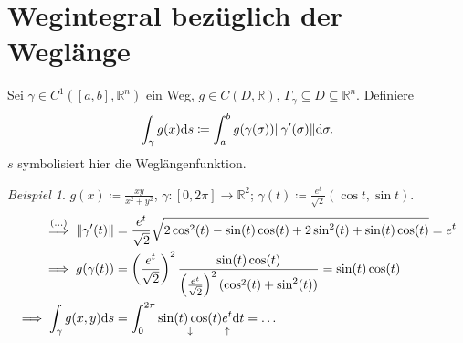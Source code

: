 \documentclass[a4paper]{article}
\theoremstyle{definition}
\theoremstyle{remark}
\newtheorem{beispiel}{Beispiel}
\renewcommand{\d}[1]{\mathrm{d}#1}
\begin{document}
	\section*{Wegintegral bezüglich der Weglänge}
		Sei $\gamma\in C^1([a, b], \mathbb{R}^n)$ ein Weg, $g\in C(D, \mathbb{R})$,
		$\Gamma_\gamma\subseteq D\subseteq\mathbb{R}^n$. Definiere
		\[
			\int_\gamma g(x)\d{s}\coloneqq\int_a^b g(\gamma(\sigma))\norm{\gamma'(\sigma)}\d{\sigma}.
		\]
		$s$ symbolisiert hier die Weglängenfunktion.
		\begin{beispiel}
			$g(x)\coloneqq\frac{xy}{x^2+y^2}$, $\gamma\colon[0, 2\pi]\to\mathbb{R}^2$;
			$\gamma(t)\coloneqq\frac{e^t}{\sqrt{2}}(\cos t, \sin t)$.
			\begin{align*}
				\stackrel{(\ldots)}{\implies}\norm{\gamma'(t)}&=\frac{e^t}{\sqrt{2}}
					\sqrt{2\cos^2(t)-\sin(t)\cos(t)+2\sin^2(t)+\sin(t)\cos(t)} = e^t\\
				\implies g(\gamma(t))&=\left(\frac{e^t}{\sqrt{2}}\right)^2
					\frac{\sin(t)\cos(t)}{\left(\frac{e^t}{\sqrt{2}}\right)^2(\cos^2(t)+\sin^2(t))}=\sin(t)\cos(t)\\
				\implies \int_\gamma g(x, y)\d{s}&=\int_0^{2\pi}\underset{\downarrow}{\sin(t)\cos(t)}\underset{\uparrow}{\vphantom{)}e^t}\d{t}
				= \ldots
			\end{align*}
		\end{beispiel}
\end{document}
